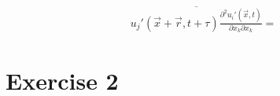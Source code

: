 \documentclass[paper=a4, fontsize=11pt]{scrartcl} %
\numberwithin{equation}{section} %
\numberwithin{figure}{section} %
\numberwithin{table}{section} %
\begin{document}
	\begin{equation}
		\begin{aligned}
			\overline{u_j'(\vec{x} + \vec{r}, t + \tau) \frac{\partial^2 u_i'(\vec{x}, t)}{\partial x_k \partial x_k}} = 
		\end{aligned}
	\end{equation}
	
	
\section{Exercise 2}
	
	
\end{document}
